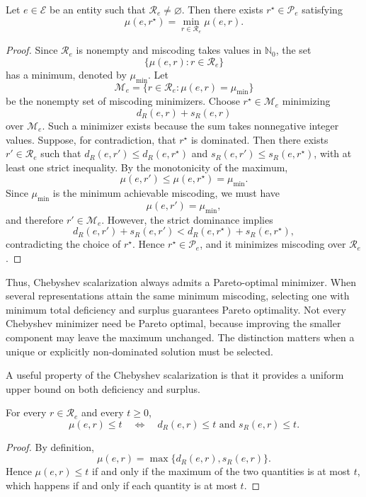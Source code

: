 \begin{proposition}
\label{prop:chebyshev_minimizer_pareto}
Let $e\in\mathcal E$ be an entity such that $\mathcal R_e\neq\varnothing$. Then there exists $r^\star\in\mathcal P_e$ satisfying
\[
\mu(e,r^\star) = \min_{r\in\mathcal R_e}\mu(e,r).
\]
\end{proposition}
\begin{proof}
Since $\mathcal R_e$ is nonempty and miscoding takes values in $\mathbb N_0$, the set
\[
\{\mu(e,r):r\in\mathcal R_e\}
\]
has a minimum, denoted by $\mu_{\min}$. Let
\[
\mathcal M_e = \{r\in\mathcal R_e:\mu(e,r)=\mu_{\min}\}
\]
be the nonempty set of miscoding minimizers. Choose $r^\star\in\mathcal M_e$ minimizing
\[
d_R(e,r)+s_R(e,r)
\]
over $\mathcal M_e$. Such a minimizer exists because the sum takes nonnegative integer values. Suppose, for contradiction, that $r^\star$ is dominated. Then there exists $r'\in\mathcal R_e$ such that $d_R(e,r')\le d_R(e,r^\star)$ and $s_R(e,r')\le s_R(e,r^\star)$, with at least one strict inequality. By the monotonicity of the maximum,
\[
\mu(e,r')\le\mu(e,r^\star)=\mu_{\min}.
\]
Since $\mu_{\min}$ is the minimum achievable miscoding, we must have
\[
\mu(e,r')=\mu_{\min},
\]
and therefore $r'\in\mathcal M_e$. However, the strict dominance implies
\[
d_R(e,r')+s_R(e,r') < d_R(e,r^\star)+s_R(e,r^\star),
\]
contradicting the choice of $r^\star$. Hence $r^\star\in\mathcal P_e$, and it minimizes miscoding over $\mathcal R_e$.
\end{proof}

Thus, Chebyshev scalarization always admits a Pareto-optimal minimizer. When several representations attain the same minimum miscoding, selecting one with minimum total deficiency and surplus guarantees Pareto optimality. Not every Chebyshev minimizer need be Pareto optimal, because improving the smaller component may leave the maximum unchanged. The distinction matters when a unique or explicitly non-dominated solution must be selected.

A useful property of the Chebyshev scalarization is that it provides a uniform upper bound on both deficiency and surplus.

\begin{proposition}
\label{prop:chebyshev_sublevel_sets}
For every $r\in\mathcal R_e$ and every $t\ge 0$,
\[
\mu(e,r)\le t \quad\Longleftrightarrow\quad d_R(e,r)\le t \text{ and } s_R(e,r)\le t.
\]
\end{proposition}
\begin{proof}
By definition,
\[
\mu(e,r) = \max\{d_R(e,r),s_R(e,r)\}.
\]
Hence $\mu(e,r)\le t$ if and only if the maximum of the two quantities is at most $t$, which happens if and only if each quantity is at most $t$.
\end{proof}

